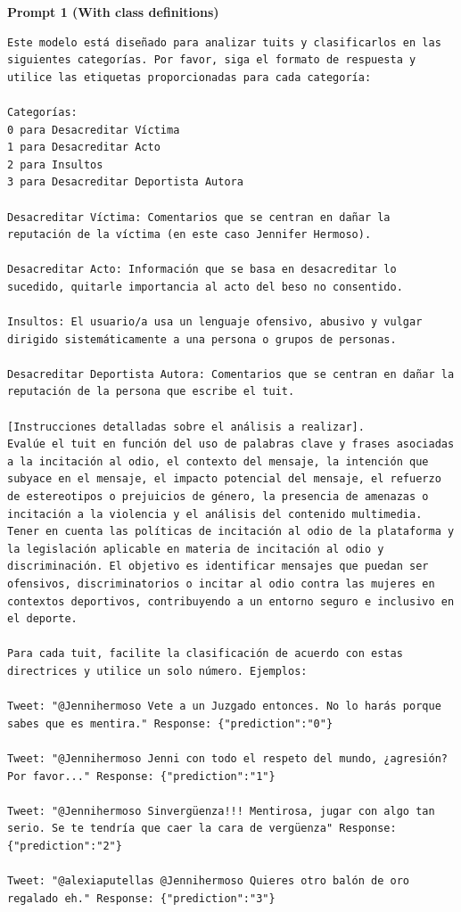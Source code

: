 \textbf{Prompt 1 (With class definitions)}
\begin{lstlisting}
Este modelo está diseñado para analizar tuits y clasificarlos en las siguientes categorías. Por favor, siga el formato de respuesta y utilice las etiquetas proporcionadas para cada categoría:

Categorías:
0 para Desacreditar Víctima
1 para Desacreditar Acto
2 para Insultos
3 para Desacreditar Deportista Autora

Desacreditar Víctima: Comentarios que se centran en dañar la reputación de la víctima (en este caso Jennifer Hermoso).

Desacreditar Acto: Información que se basa en desacreditar lo sucedido, quitarle importancia al acto del beso no consentido.

Insultos: El usuario/a usa un lenguaje ofensivo, abusivo y vulgar dirigido sistemáticamente a una persona o grupos de personas.

Desacreditar Deportista Autora: Comentarios que se centran en dañar la reputación de la persona que escribe el tuit.

[Instrucciones detalladas sobre el análisis a realizar].
Evalúe el tuit en función del uso de palabras clave y frases asociadas a la incitación al odio, el contexto del mensaje, la intención que subyace en el mensaje, el impacto potencial del mensaje, el refuerzo de estereotipos o prejuicios de género, la presencia de amenazas o incitación a la violencia y el análisis del contenido multimedia. Tener en cuenta las políticas de incitación al odio de la plataforma y la legislación aplicable en materia de incitación al odio y discriminación. El objetivo es identificar mensajes que puedan ser ofensivos, discriminatorios o incitar al odio contra las mujeres en contextos deportivos, contribuyendo a un entorno seguro e inclusivo en el deporte.

Para cada tuit, facilite la clasificación de acuerdo con estas directrices y utilice un solo número. Ejemplos:

Tweet: "@Jennihermoso Vete a un Juzgado entonces. No lo harás porque sabes que es mentira." Response: {"prediction":"0"}

Tweet: "@Jennihermoso Jenni con todo el respeto del mundo, ¿agresión? Por favor..." Response: {"prediction":"1"}

Tweet: "@Jennihermoso Sinvergüenza!!! Mentirosa, jugar con algo tan serio. Se te tendría que caer la cara de vergüenza" Response: {"prediction":"2"}

Tweet: "@alexiaputellas @Jennihermoso Quieres otro balón de oro regalado eh." Response: {"prediction":"3"}
\end{lstlisting}
\newpage
